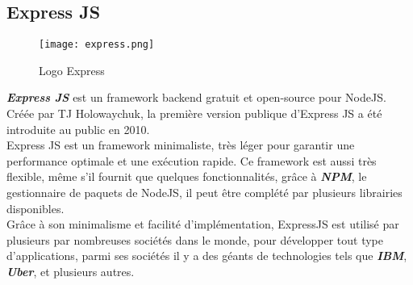 \subsection{Express JS}
\vspace{1cm}
\begin{figure}[H]
    \centering
    \texttt{[image: express.png]}
    \vspace{1cm}
    \captionsetup{justification=centering}
    \caption{Logo Express}
    \label{fig:express_logo}
\end{figure}
\textit{\textbf{Express JS}} \cite{expressjs} est un framework backend gratuit et open-source pour NodeJS. Créée par TJ Holowaychuk, la première version publique d'Express JS a été introduite au public en 2010.\\
Express JS est un framework minimaliste, très léger pour garantir une performance optimale et une exécution rapide. Ce framework est aussi très flexible, même s'il fournit que quelques fonctionnalités, grâce à \textit{\textbf{NPM}}, le gestionnaire de paquets de NodeJS, il peut être complété par plusieurs librairies disponibles.\\
\noindent Grâce à son minimalisme et facilité d'implémentation, ExpressJS est utilisé par plusieurs par nombreuses sociétés dans le monde, pour développer tout type d'applications, parmi ses sociétés il y a des géants de technologies tels que \textit{\textbf{IBM}}, \textit{\textbf{Uber}}, et plusieurs autres.


